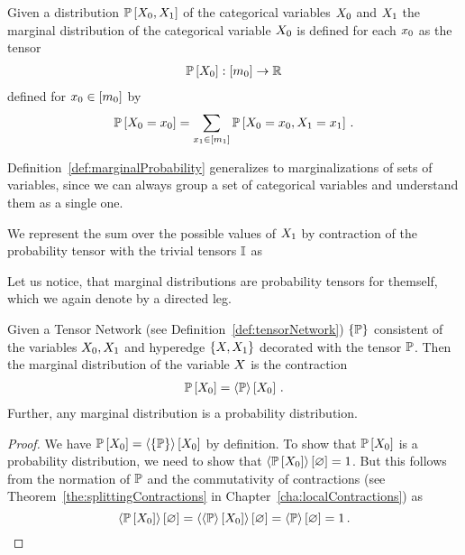 \begin{definition}\label{def:marginalProbability}
	Given a distribution $\mathbb{P}\left[X_{0},X_{1}\right]$ of the categorical variables $X_{0}$ and $X_{1}$ the marginal distribution of the categorical variable $X_{0}$ is defined for each $x_{0}$ as the tensor
	\begin{align*}
		\mathbb{P}\left[X_{0}\right] : [m_{0}] \rightarrow \mathbb{R}
	\end{align*}
	defined for $x_{0}\in[m_{0}]$ by
	\begin{align*}
		\mathbb{P}\left[X_{0}=x_{0}\right] 
		= \sum_{x_{1}\in[m_{1}]} \mathbb{P}\left[X_{0}=x_{0},X_{1}=x_{1}\right] \, .
	\end{align*}
\end{definition}

Definition~\ref{def:marginalProbability} generalizes to marginalizations of sets of variables, since we can always group a set of categorical variables and understand them as a single one.

We represent the sum over the possible values of $X_{1}$ by contraction of the probability tensor with the trivial tensors $\mathbb{I}$ as 
\begin{center}
	
\end{center}
Let us notice, that marginal distributions are probability tensors for themself, which we again denote by a directed leg.

\begin{theorem}\label{the:marginalContraction}
	Given a Tensor Network (see Definition~\ref{def:tensorNetwork}) $\{\mathbb{P}\}$ consistent of the variables $X_{0},X_{1}$ and hyperedge $\{X,X_{1}\}$ decorated with the tensor $\mathbb{P}$.
	Then the marginal distribution of the variable $X$ is the contraction
	\begin{align*}
		\mathbb{P}\left[X_{0}\right] = \left\langle \mathbb{P}\right\rangle \left[ X_{0} \right] \, .
	\end{align*}
	Further, any marginal distribution is a probability distribution.
\end{theorem}
\begin{proof}
	We have $\mathbb{P}\left[X_{0}\right] = \left\langle \{\mathbb{P}\}\right\rangle \left[ X_{0} \right]$ by definition.
	To show that $\mathbb{P}\left[X_{0}\right]$ is a probability distribution, we need to show that $\left\langle \mathbb{P}\left[X_{0}\right]\right\rangle \left[ \varnothing \right]=1$.
	But this follows from the normation of $\mathbb{P}$ and the commutativity of contractions (see Theorem~\ref{the:splittingContractions} in Chapter~\ref{cha:localContractions}) as
		\[ \left\langle \mathbb{P}\left[X_{0}\right]\right\rangle \left[ \varnothing \right] = 
		\left\langle 
			\left\langle \mathbb{P}\right\rangle \left[ X_{0} \right]
		\right\rangle \left[ \varnothing \right] =
		 \left\langle \mathbb{P}\right\rangle \left[ \varnothing \right]
		= 1 \, . 
		\]
\end{proof}




